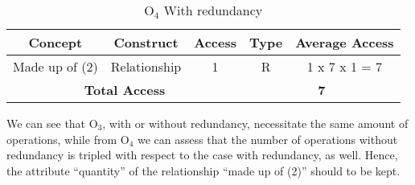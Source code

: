 \begin{table}[!h]\caption{	$ \textrm{O}_\textrm{4} $ With redundancy}
	\begin{center}
		\begin{tabular}{| c | c | c | c | c |}
			\hline
			\textbf{Concept} & \textbf{Construct} & \textbf{Access} & \textbf{Type} & \textbf{Average Access} \\ \hline
			Made up of (2) & Relationship & 1 & R & 1 x 7 x 1 = 7 \\ \hline	
			\multicolumn{3}{|c|}{\textbf{Total Access}} & \multicolumn{2}{|c|}{\textbf{7}} \\ \hline
		\end{tabular}
	\end{center}
\end{table}
We can see that $ \textrm{O}_\textrm{3} $, with or without redundancy, necessitate the same amount of operations, while from $ \textrm{O}_\textrm{4} $ we can assess that the number of operations without redundancy is tripled with respect to the case with redundancy, as well. Hence, the attribute ``quantity'' of the relationship ``made up of (2)'' should to be kept.